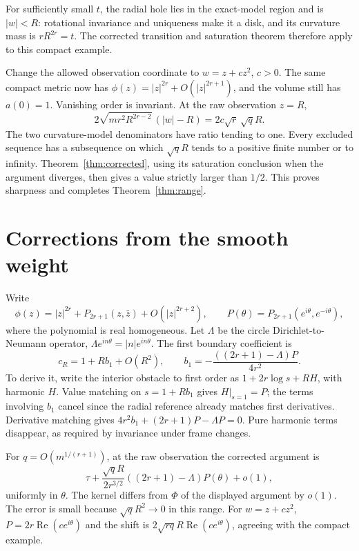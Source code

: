 \documentclass[11pt]{article}
\theoremstyle{remark}\newtheorem{remark}[theorem]{Remark}
\newcommand{\PhiG}{\Phi}
\DeclareMathOperator{\Rea}{Re}
\begin{document}
For sufficiently small $t$, the radial hole lies in the exact-model
region and is $|w|<R$: rotational invariance and uniqueness make it a
disk, and its curvature mass is $rR^{2r}=t$. The corrected transition
and saturation theorem therefore apply to this compact example.

Change the allowed observation coordinate to $w=z+c z^2$, $c>0$.
The same compact metric now has
$\phi(z)=|z|^{2r}+O(|z|^{2r+1})$, and the volume still has $a(0)=1$.
Vanishing order is invariant. At the raw observation $z=R$,
\[
 2\sqrt{mr^2R^{2r-2}}\,(|w|-R)
 =2c\sqrt r\,\sqrt q R.
\]
The two curvature-model denominators have ratio tending to one.
Every excluded sequence has a subsequence on which $\sqrt q R$ tends
to a positive finite number or to infinity. Theorem~\ref{thm:corrected}, using its saturation conclusion when the
argument diverges, then gives a value strictly larger than $1/2$. This proves sharpness
and completes Theorem~\ref{thm:range}.

\section{Corrections from the smooth weight}\label{sec:corrections}
Write
\[
 \phi(z)=|z|^{2r}+P_{2r+1}(z,\bar z)+O(|z|^{2r+2}),\qquad
 P(\theta)=P_{2r+1}(e^{i\theta},e^{-i\theta}),
\]
where the polynomial is real homogeneous. Let $\Lambda$ be the
circle Dirichlet-to-Neumann operator,
$\Lambda e^{in\theta}=|n|e^{in\theta}$. The first boundary coefficient is
\begin{equation}\label{eq:b1}
 c_R=1+Rb_1+O(R^2),\qquad
 b_1=-\frac{((2r+1)-\Lambda)P}{4r^2}.
\end{equation}
To derive it, write the interior obstacle to first order as
$1+2r\log s+R H$, with harmonic $H$. Value matching on
$s=1+Rb_1$ gives $H|_{s=1}=P$; the terms involving $b_1$ cancel since
the radial reference already matches first derivatives. Derivative
matching gives $4r^2b_1+(2r+1)P-\Lambda P=0$.
Pure harmonic terms disappear, as required by invariance under frame
changes.

For $q=O(m^{1/(r+1)})$, at the raw observation the corrected argument is
\begin{equation}\label{eq:firstshift}
 \tau+\frac{\sqrt q R}{2r^{3/2}}((2r+1)-\Lambda)P(\theta)+o(1),
\end{equation}
uniformly in $\theta$. The kernel differs from $\PhiG$ of the displayed
argument by $o(1)$. The error is small because $\sqrt q R^2\to0$ in
this range. For $w=z+cz^2$, $P=2r\Rea(ce^{i\theta})$ and the shift is
$2\sqrt{rq}R\Rea(ce^{i\theta})$, agreeing with the compact example.
\end{document}
